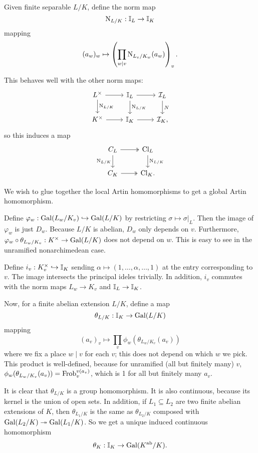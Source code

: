 \documentclass[11pt]{amsart}
\begin{document}
\begin{defn}
    Given finite separable $L/K$, define the norm map
    \[\operatorname{N}_{L/K}:\mathbb{I}_L \to \mathbb{I}_K\]
    mapping
    \[(a_w)_w \mapsto \left( \prod_{w\mid v} \operatorname{N}_{L_v/K_w}(a_w) \right)_v.\]
\end{defn}


This behaves well with the other norm maps:
\[\begin{tikzcd}
	{L^\times} & {\II_L} & {\cI_L} \\
	{K^\times} & {\II_K} & {\cI_K},
	\arrow["{\N_{L/K}}", from=1-1, to=2-1]
	\arrow[from=1-1, to=1-2]
	\arrow["{\N_{L/K}}", from=1-2, to=2-2]
	\arrow[from=2-1, to=2-2]
	\arrow[from=1-2, to=1-3]
	\arrow["N", from=1-3, to=2-3]
	\arrow[from=2-2, to=2-3]
\end{tikzcd}\]
so this induces a map
\[\begin{tikzcd}
	{C_L} & {\Cl_L} \\
	{C_K} & {\Cl_K}.
	\arrow["{\N_{L/K}}"', from=1-1, to=2-1]
	\arrow[two heads, from=1-1, to=1-2]
	\arrow[two heads, from=2-1, to=2-2]
	\arrow["{\N_{L/K}}", from=1-2, to=2-2]
\end{tikzcd}\]

We wish to glue together the local Artin homomorphisms to get a global Artin homomorphism.

Define $\varphi_w: \operatorname{Gal}(L_w/K_v)\hookrightarrow \operatorname{Gal}(L/K)$ by restricting $\sigma \mapsto \sigma|_L$. Then the image of $\varphi_w$ is just $D_w$. Because $L/K$ is abelian, $D_w$ only depends on $v$. Furthermore, $\varphi_w\circ \theta_{L_w/K_v}: K^\times \to \operatorname{Gal}(L/K)$ does not depend on $w$. This is easy to see in the unramified nonarchimedean case.


Define $i_v: K_v^\times \hookrightarrow \mathbb{I}_K$ sending $\alpha \mapsto (1,\dots,\alpha, \dots, 1)$ at the entry corresponding to $v$. The image intersects the principal ideles trivially. In addition, $i_v$ commutes with the norm maps $L_w\to K_v$ and $\mathbb{I}_L\to \mathbb{I}_K$.

Now, for a finite abelian extension $L/K$, define a map
\[\theta_{L/K}: \mathbb{I}_K \to \operatorname{Gal}(L/K)\]
mapping
\[(a_v)_v \mapsto \prod_{v} \phi_w(\theta_{L_w/K_v}(a_v))\]
where we fix a place $w\mid v$ for each $v$; this does not depend on which $w$ we pick. This product is well-defined, because for unramified (all but finitely many) $v$, $\phi_w(\theta_{L_w/K_v}(a_v)) = \operatorname{Frob}_v^{v(a_v)}$, which is 1 for all but finitely many $a_v$.

It is clear that $\theta_{L/K}$ is a group homomorphism. It is also continuous, because its kernel is the union of open sets. In addition, if $L_1\subseteq L_2$ are two finite abelian extensions of $K$, then $\theta_{L_1/K}$ is the same as $\theta_{L_2/K}$ composed with $\operatorname{Gal}(L_2/K)\twoheadrightarrow \operatorname{Gal}(L_1/K)$. So we get a unique induced continuous homomorphism
\[\theta_{K}: \mathbb{I}_K \to \operatorname{Gal}(K^{\operatorname{ab}}/K).\]
\end{document}

